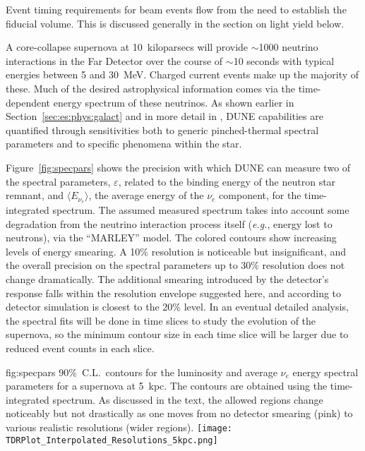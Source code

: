 Event timing requirements for beam events flow from the
need to establish the fiducial volume.  This is discussed
generally in the section on light yield below.

  A core-collapse
supernova at 10~kiloparsecs will provide $\sim$1000 neutrino
interactions in the Far Detector over the course of
$\sim$10 seconds with typical energies between 5 and 30~MeV.
Charged current \nue{} events make up the majority of these.
Much of the desired astrophysical information comes via the
time-dependent energy spectrum of these neutrinos.  As shown
earlier in Section~\ref{sec:es:phys:galact} and 
in more detail in \physchsnb,
DUNE capabilities are quantified through sensitivities
both to generic pinched-thermal spectral parameters 
and to
specific phenomena within the star.

Figure~\ref{fig:specpars} shows the precision with which DUNE
can measure two of the spectral parameters, $\varepsilon$, related to
the binding energy of the neutron star remnant, and $\langle
E_{\nu_e}\rangle$, the average energy of the $\nu_e$ component, for the
time-integrated spectrum.
The assumed measured spectrum takes into account some degradation
from the neutrino interaction process itself 
({\em e.g.}, energy lost to neutrons), via the ``MARLEY'' model.
The colored contours show increasing levels of energy smearing.
A 10\% resolution is noticeable but insignificant, and the
overall precision on the spectral parameters up to 30\%
resolution does not change dramatically.
The additional smearing introduced by the detector's response
falls within the resolution envelope suggested here, and according to
detector simulation is closest to the 20\% level.
In an eventual detailed analysis, the spectral
fits will be done in time slices to study the evolution of
the supernova, so the minimum contour size in each time slice
will be larger due to reduced event counts in each slice.

\begin{dunefigure}
{fig:specpars}
{90\%~C.L.\ contours for the luminosity and average $\nu_e$ energy
spectral parameters for a supernova
at 5~kpc.  The contours are obtained using the time-integrated
spectrum.  As discussed in the text, the allowed regions
change noticeably but not drastically as one moves from
no detector smearing (pink) to various realistic resolutions (wider regions).}
  \texttt{[image: TDRPlot\_Interpolated\_Resolutions\_5kpc.png]}
\end{dunefigure}

